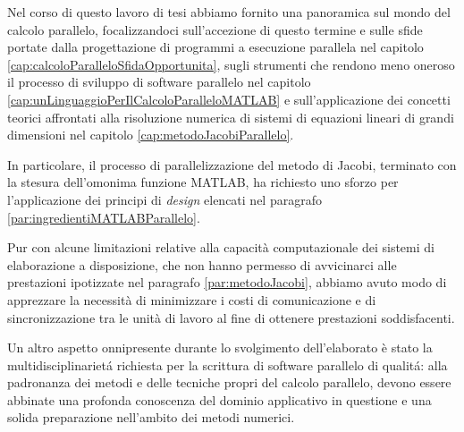 Nel corso di questo lavoro di tesi abbiamo fornito una panoramica sul mondo del calcolo parallelo, focalizzandoci sull'accezione di questo termine e sulle sfide portate dalla progettazione di programmi a esecuzione parallela nel capitolo \ref{cap:calcoloParalleloSfidaOpportunita}, sugli strumenti che rendono meno oneroso il processo di sviluppo di software parallelo
nel capitolo \ref{cap:unLinguaggioPerIlCalcoloParalleloMATLAB} e sull'applicazione dei concetti teorici affrontati alla risoluzione numerica di sistemi di equazioni lineari di grandi dimensioni nel capitolo \ref{cap:metodoJacobiParallelo}.

In particolare, il processo di parallelizzazione del metodo di Jacobi, terminato con la stesura dell'omonima funzione 
MATLAB, ha richiesto uno sforzo per l'applicazione dei principi di \textit{design} elencati nel paragrafo \ref{par:ingredientiMATLABParallelo}.

Pur con alcune limitazioni relative alla capacit\`a computazionale dei sistemi di elaborazione a disposizione, che non hanno 
permesso di avvicinarci alle prestazioni ipotizzate nel paragrafo \ref{par:metodoJacobi}, 
abbiamo avuto modo di apprezzare la necessit\`a di minimizzare i costi di comunicazione e di sincronizzazione tra le unit\`a di lavoro 
al fine di ottenere prestazioni soddisfacenti.%

Un altro aspetto onnipresente durante lo svolgimento dell'elaborato \`e stato la multidisciplinariet\'a richiesta per la scrittura 
di software parallelo di qualit\'a: alla padronanza dei metodi e delle tecniche propri del calcolo parallelo, devono essere 
abbinate una profonda conoscenza del dominio applicativo in questione e una solida preparazione nell'ambito dei metodi numerici.